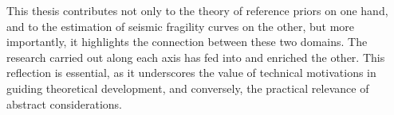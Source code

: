 



This thesis contributes not only to the theory of reference priors on one hand, and to the estimation of seismic fragility curves on the other, but more importantly, it highlights the connection between these two domains. The research carried out along each axis has fed into and enriched the other. This reflection is essential, as it underscores the value of technical motivations in guiding theoretical development, and conversely, the practical relevance of abstract considerations. %

